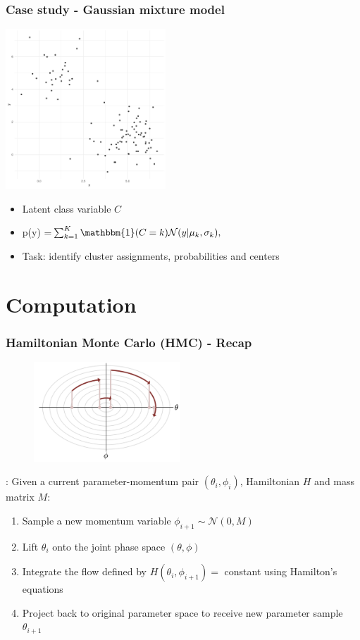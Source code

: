 \documentclass[10pt]{beamer}
\begin{document}
\begin{frame}
	\frametitle{Case study - Gaussian mixture model} 
	\centering
	\includegraphics[width=6cm]{figs/data.pdf}
	\begin{itemize}
		\item Latent class variable $C$
		\item p(y) =$ \sum_{k = 1}^K \mathbbm{1}(C = k)\mathcal{N}(y | \mu_k, \sigma_k),$
		\item Task: identify cluster assignments, probabilities and centers
	\end{itemize}
\end{frame}

\section{Computation}

\frame{\sectionpage}
\begin{frame}
	\frametitle{Hamiltonian Monte Carlo (HMC) - Recap}
	\begin{figure}
		\centering
		\includegraphics[width=5.5cm]{figs/hmc.png}
	\end{figure}
	\cite{betancourt}: Given a current parameter-momentum pair  $(\theta_i, \phi_i)$, Hamiltonian $H$ and mass matrix $M$:
	\begin{enumerate}
		\item Sample a new momentum variable $\phi_{i+1} \sim \mathcal{N}(0, M)$
		\item Lift $\theta_i$ onto the joint phase space $(\theta, \phi)$
		\item Integrate the flow defined by $H(\theta_i, \phi_{i+1}) =$ constant using Hamilton's equations
		\item Project back to original parameter space to receive new parameter sample $\theta_{i+1}$
	\end{enumerate}
\end{frame}
\end{document}
